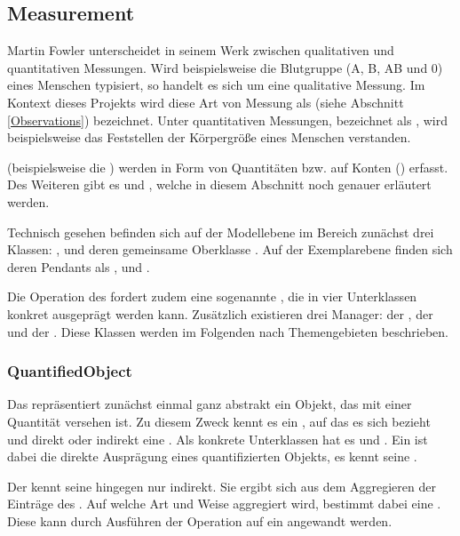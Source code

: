 \subsection{Measurement}
Martin Fowler unterscheidet in seinem Werk  zwischen qualitativen und quantitativen
Messungen. Wird beispielsweise die Blutgruppe (A, B, AB und 0) eines Menschen typisiert, so handelt es sich um
eine qualitative Messung. Im Kontext dieses Projekts wird diese Art von Messung als  (siehe Abschnitt
\ref{Observations}) bezeichnet. Unter quantitativen Messungen, bezeichnet als , wird
beispielsweise das Feststellen der Körpergröße eines Menschen verstanden.

 (beispielsweise die ) werden in Form von Quantitäten bzw.
 auf Konten () erfasst. Des Weiteren gibt es  und
, welche in diesem Abschnitt noch genauer erläutert werden.

Technisch gesehen befinden sich auf der Modellebene im Bereich  zunächst drei Klassen:
,  und deren gemeinsame Oberklasse . Auf der
Exemplarebene finden sich deren Pendants als ,  und .

Die Operation  des  fordert zudem eine sogenannte ,
die in vier Unterklassen konkret ausgeprägt werden kann.
Zusätzlich existieren drei Manager: der , der  und der
. Diese Klassen werden im Folgenden nach Themengebieten beschrieben.


\subsubsection{QuantifiedObject}
Das  repräsentiert zunächst einmal ganz abstrakt ein Objekt, das mit einer Quantität versehen
ist. Zu diesem Zweck kennt es ein , auf das es sich bezieht und direkt oder indirekt eine .
Als konkrete Unterklassen hat es  und . Ein  ist dabei die
direkte Ausprägung eines quantifizierten Objekts, es kennt seine . 

Der  kennt seine  hingegen nur indirekt. Sie ergibt sich aus dem Aggregieren der Einträge
 des . Auf welche Art und Weise aggregiert wird, bestimmt dabei eine
. Diese kann durch Ausführen der Operation  auf ein 
angewandt werden.

